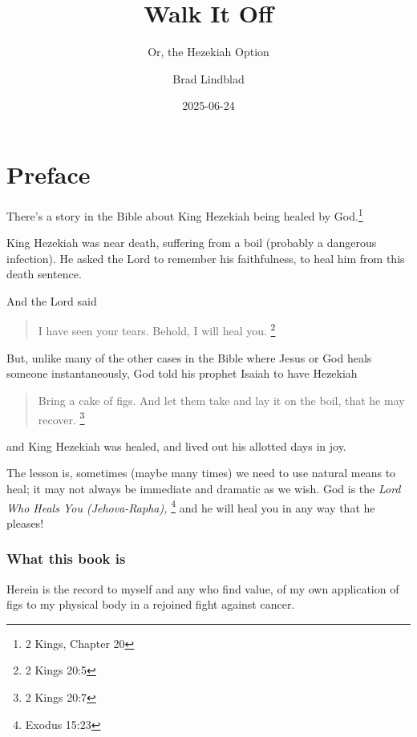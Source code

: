 \documentclass[
  letterpaper,
  DIV=11,
  numbers=noendperiod]{scrreprt}
\title{Walk It Off}
\subtitle{Or, the Hezekiah Option}
\author{Brad Lindblad}
\date{2025-06-24}
\renewcommand*\contentsname{Table of contents}
\newcommand\contentsname{Table of contents}
\begin{document}
\maketitle

\renewcommand*\contentsname{Table of contents}
{
\hypersetup{linkcolor=}
\setcounter{tocdepth}{2}
\tableofcontents
}

\chapter{Preface}\label{preface}

There's a story in the Bible about King Hezekiah being healed by
God.\footnote{2 Kings, Chapter 20}

King Hezekiah was near death, suffering from a boil (probably a
dangerous infection). He asked the Lord to remember his faithfulness, to
heal him from this death sentence.

And the Lord said

\begin{quote}
I have seen your tears. Behold, I will heal you. \footnote{2 Kings 20:5}
\end{quote}

But, unlike many of the other cases in the Bible where Jesus or God
heals someone instantaneously, God told his prophet Isaiah to have
Hezekiah

\begin{quote}
Bring a cake of figs. And let them take and lay it on the boil, that he
may recover. \footnote{2 Kings 20:7}
\end{quote}

and King Hezekiah was healed, and lived out his allotted days in joy.

The lesson is, sometimes (maybe many times) we need to use natural means
to heal; it may not always be immediate and dramatic as we wish. God is
the \emph{Lord Who Heals You (Jehova-Rapha),} \footnote{Exodus 15:23}
and he will heal you in any way that he pleases!

\subsection{What this book is}\label{what-this-book-is}

Herein is the record to myself and any who find value, of my own
application of figs to my physical body in a rejoined fight against
cancer.

\end{document}
